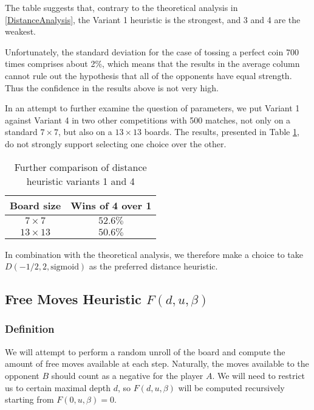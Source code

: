\documentclass[oneside]{article}   	%
\begin{document}
The table suggests that, contrary to the theoretical analysis in \ref{DistanceAnalysis}, the Variant 1 heuristic is the strongest, and 3 and 4 are the weakest.

Unfortunately, the standard deviation for the case of tossing a perfect coin 700 times comprises about 2\%, which means that the results in the average column cannot rule out the hypothesis that all of the opponents have equal strength. Thus the confidence in the results above is not very high.

In an attempt to further examine the question of parameters, we put Variant 1 against Variant 4 in two other competitions with 500 matches, not only on a standard $7\times 7$, but also on a $13\times 13$ boards. The results, presented in Table \ref{DistanceBoards}, do not strongly support selecting one choice over the other. 

\begin{table}[htp]
\caption{Further comparison of distance heuristic variants 1 and 4}
\begin{center}
\begin{tabular}{c|c}
   Board size & Wins of 4 over 1 \\
   \hline
 $7\times 7$   & $52.6\%$ \\
 $13\times 13$ & $50.6\%$
 
\end{tabular}
\end{center}
\label{DistanceBoards}
\end{table}%

In combination with the theoretical analysis, we therefore make a choice to take $D(-1/2, 2, \textrm{sigmoid})$ as the preferred distance heuristic.


\subsection{Free Moves Heuristic $F(d, u, \beta)$}

\subsubsection{Definition}
We will attempt to perform a random unroll of the board and compute the amount of free moves available at each step. Naturally, the moves available to the opponent $B$ should count as a negative for the player $A$. We will need to restrict us to certain maximal depth $d$, so $F(d, u, \beta)$ will be computed recursively starting from $F(0, u, \beta) = 0$.
\end{document}
